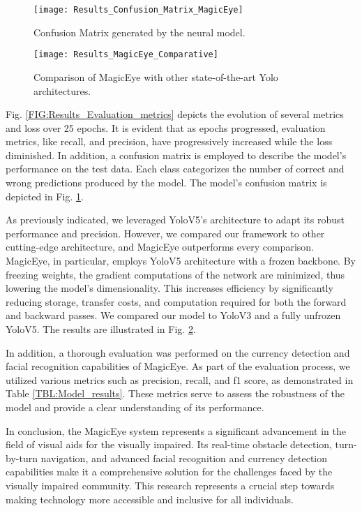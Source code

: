 \documentclass[journal,12pt,onecolumn,letterpaper]{IEEEtran}
\begin{document}
\begin{figure}[t]
\centering
	\texttt{[image: Results\_Confusion\_Matrix\_MagicEye]}
\caption{Confusion Matrix generated by the neural model.}
\label{FIG:Results_Confusion_Matrix_MagicEye}
\end{figure}

\begin{figure}[htbp]
\centering
	\texttt{[image: Results\_MagicEye\_Comparative]}
\caption{Comparison of MagicEye with other state-of-the-art Yolo architectures.}
\label{FIG:Results_MagicEye_Comparative}
\end{figure}

Fig. \ref{FIG:Results_Evaluation_metrics} depicts the evolution of several metrics and loss over 25 epochs. It is evident that as epochs progressed, evaluation metrics, like recall, and precision, have progressively increased while the loss diminished. In addition,  a confusion matrix is employed to describe the model's performance on the test data. Each class categorizes the number of correct and wrong predictions produced by the model. The model's confusion matrix is depicted in Fig. \ref{FIG:Results_Confusion_Matrix_MagicEye}.

As previously indicated, we leveraged YoloV5's architecture to adapt its robust performance and precision. However, we compared our framework to other cutting-edge architecture, and MagicEye outperforms every comparison. MagicEye, in particular, employs YoloV5 architecture with a frozen backbone. By freezing weights, the gradient computations of the network are minimized, thus lowering the model's dimensionality. This increases efficiency by significantly reducing storage, transfer costs, and computation required for both the forward and backward passes. We compared our model to YoloV3 \cite{redmon_yolov3_2018} and a fully unfrozen YoloV5. The results are illustrated in Fig. \ref{FIG:Results_MagicEye_Comparative}.

In addition, a thorough evaluation was performed on the currency detection and facial recognition capabilities of MagicEye. As part of the evaluation process, we utilized various metrics such as precision, recall, and f1 score, as demonstrated in Table \ref{TBL:Model_results}. These metrics serve to assess the robustness of the model and provide a clear understanding of its performance. 



In conclusion, the MagicEye system represents a significant advancement in the field of visual aids for the visually impaired. Its real-time obstacle detection, turn-by-turn navigation, and advanced facial recognition and currency detection capabilities make it a comprehensive solution for the challenges faced by the visually impaired community. This research represents a crucial step towards making technology more accessible and inclusive for all individuals.
\end{document}
